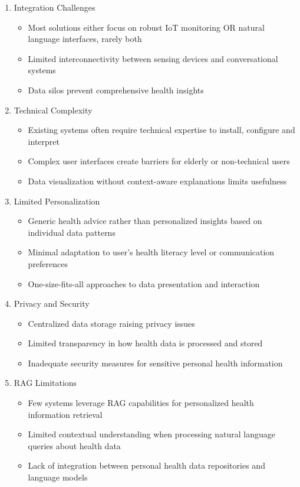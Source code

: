 \begin{enumerate}
    \item Integration Challenges
    \begin{itemize}
        \item Most solutions either focus on robust IoT monitoring OR natural language interfaces, rarely both
        \item Limited interconnectivity between sensing devices and conversational systems
        \item Data silos prevent comprehensive health insights
    \end{itemize}

    \item Technical Complexity
    \begin{itemize}
        \item Existing systems often require technical expertise to install, configure and interpret
        \item Complex user interfaces create barriers for elderly or non-technical users
        \item Data visualization without context-aware explanations limits usefulness
    \end{itemize}

    \item Limited Personalization
    \begin{itemize}
        \item Generic health advice rather than personalized insights based on individual data patterns
        \item Minimal adaptation to user's health literacy level or communication preferences
        \item One-size-fits-all approaches to data presentation and interaction
    \end{itemize}

    \item Privacy and Security
    \begin{itemize}
        \item Centralized data storage raising privacy issues
        \item Limited transparency in how health data is processed and stored
        \item Inadequate security measures for sensitive personal health information
    \end{itemize}

    \item RAG Limitations
    \begin{itemize}
        \item Few systems leverage RAG capabilities for personalized health information retrieval
        \item Limited contextual understanding when processing natural language queries about health data
        \item Lack of integration between personal health data repositories and language models
    \end{itemize}
\end{enumerate}

